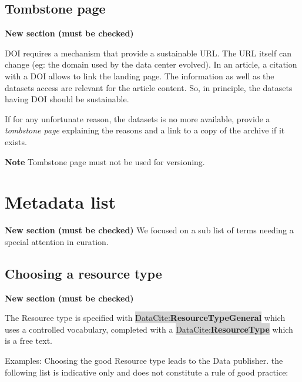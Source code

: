 \documentclass[11pt,a4paper]{ivoa}
\newcommand{\dataciteterm}[1]{\colorbox{lightgray}{DataCite:\textbf{#1}}}
\newcommand{\important}[1]{
	\begin{bigdescription}
		\item \color{ivoacolor}\textbf{Note} #1
	\end{bigdescription}
}
\begin{document}
\subsection{Tombstone page}
\label{sec:tombstone}
\textbf{\color{red}New section (must be checked)}

DOI requires a mechanism that provide a sustainable URL. The URL itself can change (eg: the domain used by the data center evolved).
In an article, a citation with a DOI allows to link the landing page. The information as well as the datasets access are relevant for the article content. So, in principle, the datasets having DOI should be sustainable. 


If for any unfortunate reason, the datasets is no more available, provide a \textit{tombstone page} explaining the reasons and a link to a copy of the archive if it exists.

\important{Tombstone page must not be used for versioning.}


\section{Metadata list}
\textbf{\color{red}New section (must be checked)}
We focused on a sub list of terms needing a special attention in curation.

\subsection{Choosing a resource type}\label{sec:resourcetype}
\textbf{\color{red}New section (must be checked)}

The Resource type is specified with  \dataciteterm{ResourceTypeGeneral} which uses a controlled vocabulary, completed with a \dataciteterm{ResourceType} which is a free text.

Examples: Choosing the good Resource type leads to the Data publisher.
the following list is indicative only and does not constitute a rule of good practice:
\end{document}
